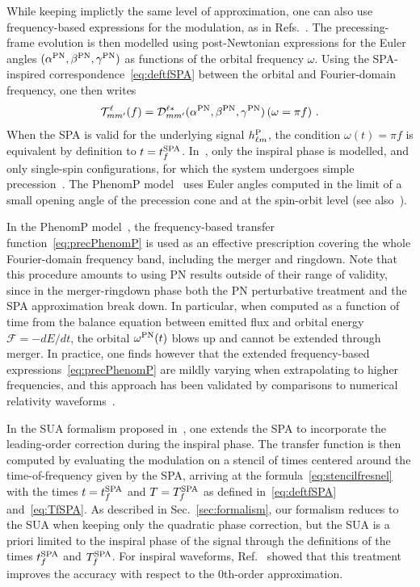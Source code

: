 \documentclass[aps,showpacs,twocolumn,
prd,superscriptaddress,nofootinbib]{revtex4-1}
\newcommand{\be}{\begin{equation}}
\newcommand{\ee}{\end{equation}}
\newcommand\calF{{\mathcal{F}}}
\newcommand\calT{{\mathcal{T}}}
\newcommand\calD{{\mathcal{D}}}
\newcommand{\tfSPA}{t_{f}^{\rm SPA}}
\newcommand{\TfSPA}{T_{f}^{\rm SPA}}
\begin{document}
While keeping implictly the same level of approximation, one can also use frequency-based expressions for the modulation, as in Refs.~\cite{LOS13, Hannam+13}. The precessing-frame evolution is then modelled using post-Newtonian expressions for the Euler angles $(\alpha^{\rm PN}, \beta^{\rm PN}, \gamma^{\rm PN})$ as functions of the orbital frequency $\omega$. Using the SPA-inspired correspondence~\eqref{eq:deftfSPA} between the orbital and Fourier-domain frequency, one then writes 
\be\label{eq:precPhenomP}
	\calT^{\ell}_{mm'}(f) = \calD^{\ell *}_{mm'}(\alpha^{\rm PN}, \beta^{\rm PN}, \gamma^{\rm PN}) \left( \omega=\pi f\right) \,.
\ee
When the SPA is valid for the underlying signal $h^{\rm P}_{\ell m}$, the condition $\omega(t) = \pi f$ is equivalent by definition to $t=t^{\rm SPA}_{f}$. In~\cite{LOS13}, only the inspiral phase is modelled, and only single-spin configurations, for which the system undergoes simple precession~\cite{Apostolatos+94, Kidder95}. The PhenomP model~\cite{Hannam+13} uses Euler angles computed in the limit of a small opening angle of the precession cone and at the spin-orbit level (see also~\cite{BBF11, MBBB13}).

In the PhenomP model~\cite{Hannam+13}, the frequency-based transfer function~\eqref{eq:precPhenomP} is used as an effective prescription covering the whole Fourier-domain frequency band, including the merger and ringdown. Note that this procedure amounts to using PN results outside of their range of validity, since in the merger-ringdown phase both the PN perturbative treatment and the SPA approximation break down. In particular, when computed as a function of time from the balance equation between emitted flux and orbital energy $\calF = -dE/dt$, the orbital $\omega^{\rm PN}(t)$ blows up and cannot be extended through merger. In practice, one finds however that the extended frequency-based expressions~\eqref{eq:precPhenomP} are mildly varying when extrapolating to higher frequencies, and this approach has been validated by comparisons to numerical relativity waveforms~\cite{Hannam+13}.

In the SUA formalism proposed in~\cite{KCY13, KCY14}, one extends the SPA to incorporate the leading-order correction during the inspiral phase. The transfer function is then computed by evaluating the modulation on a stencil of times centered around the time-of-frequency given by the SPA, arriving at the formula~\eqref{eq:stencilfresnel} with the times $t = \tfSPA$ and $T = \TfSPA$ as defined in~\eqref{eq:deftfSPA} and~\eqref{eq:TfSPA}. As described in Sec.~\ref{sec:formalism}, our formalism reduces to the SUA when keeping only the quadratic phase correction, but the SUA is a priori limited to the inspiral phase of the signal through the definitions of the times $t^{\rm SPA}_{f}$ and $T^{\rm SPA}_{f}$. For inspiral waveforms, Ref.~\cite{KCY14} showed that this treatment improves the accuracy with respect to the 0th-order approximation.
\end{document}
